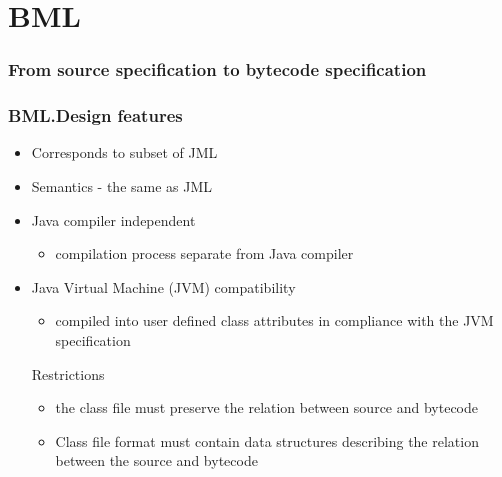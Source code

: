 \documentclass{beamer}
\begin{document}
\section{BML}
\begin{frame}[shrink]\frametitle{From source specification to bytecode specification}
\begin{center}
\end{center}
\end{frame}

  \begin{frame}\frametitle{BML.Design features}
   \begin{itemize}
      \item Corresponds to subset of JML
       \item Semantics - the same  as JML
     \item Java compiler independent
        \begin{itemize}
	    \item compilation process separate from Java compiler
	      
	  \end{itemize}
     \item Java Virtual Machine (JVM) compatibility 
       \begin{itemize}
	      \item compiled into user defined class attributes 
		 in compliance with the JVM specification
	  \end{itemize}     

Restrictions
   \begin{itemize} 
       \item the class file must preserve the relation between source and bytecode 
	 
	  
       \item Class file format must contain data structures describing the relation between 
	    the source and bytecode      
   \end{itemize}
 \end{itemize}
\end{frame}

\end{document}
